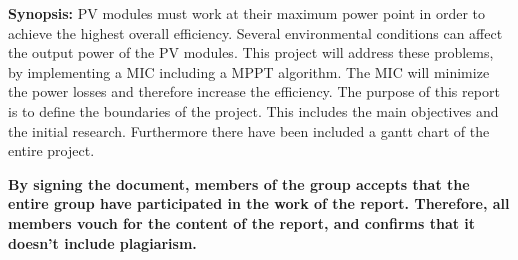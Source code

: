 \begin{tcolorbox}
\textbf{Synopsis:}\newline
PV modules must work at their maximum power point in order to achieve the highest overall efficiency. Several environmental conditions can affect the output power of the PV modules.\newline
This project will address these problems, by implementing a MIC including a MPPT algorithm. The MIC will minimize the power losses and therefore increase the efficiency.\newline
The purpose of this report is to define the boundaries of the project. This includes the main objectives and the initial research. Furthermore there have been included a gantt chart of the entire project.
\end{tcolorbox}

\vspace*{0.5cm}
\textbf{By signing the document, members of the group accepts that the entire group have participated in the work of the report. Therefore, all members vouch for the content of the report, and confirms that it doesn't include plagiarism.}

\clearpage
\tableofcontents












\printbibliography

